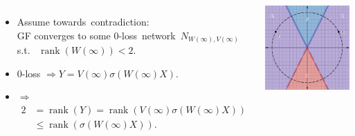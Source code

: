\documentclass[handout,usenames,dvipsnames]{beamer} %
\DeclareMathOperator{\rank}{rank}
\begin{document}
\begin{frame}
    \begin{columns}
        \begin{itemize}
            \setlength{\parskip}{0pt}
            \setlength{\abovedisplayskip}{0pt}
            \setlength{\belowdisplayskip}{0pt}
            \setlength{\abovedisplayshortskip}{0pt}
            \setlength{\belowdisplayshortskip}{0pt}
            
            \item Assume towards~contradiction:\\GF converges to some 0-loss~network~$N_{W(\infty),V(\infty)}$ s.t. ~$\rank(W(\infty))<2$. 
            \pause
            \item 0-loss $\Rightarrow Y = V(\infty) \sigma \left( W(\infty) X \right)$.
            \pause
            \item $\Rightarrow$ 
            \begin{align*}
                2 &= \rank(Y) = \rank \left( V(\infty) \sigma \left(W(\infty) X \right) \right) \\
                &\leq \rank \left( \sigma \left( W(\infty) X \right) \right).
            \end{align*}
        \end{itemize}    

        \begin{center}
            \includegraphics[width=\textwidth]{figures/D_and_Ss_regions.png}
        \end{center}
    \end{columns}
    

\end{frame}
\end{document}
